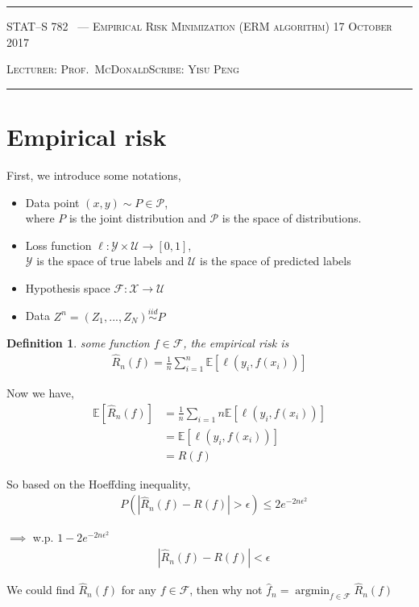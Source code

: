 \documentclass[10pt]{article}
\newcounter{lecnum}
\newtheorem{definition}[def]{Definition}
\newcommand{\Expect}[1]{\mathbb{E}\!\left[#1\right]}
\newcommand{\Y}{\mathcal{Y}}
\newcommand{\U}{\mathcal{U}}
\DeclareMathOperator*{\argmin}{argmin}
\renewcommand{\hat}{\widehat}
\newcommand{\lecturer}{Prof.\ McDonald}
\newcommand{\scribe}{Yisu Peng}
\newcommand{\chtitle}{Empirical Risk Minimization (ERM algorithm)}
\newcommand{\lecdate}{17 October 2017}
\begin{document}
\rule{6.5in}{1pt}

\textsc{STAT--S 782
        \hfill \thelecnum\ --- \chtitle
        \hfill \lecdate}

\textsc{Lecturer: \lecturer \hfill Scribe: \scribe}
\rule{6.5in}{1pt}

\section{Empirical risk}
First, we introduce some notations,
\begin{itemize}
\item Data point $(x, y) \sim P \in \mathcal{P}$, \\
where $P$ is the joint distribution and $\mathcal{P}$ is the space of distributions.
\item Loss function $\ell : \mathcal Y \times \mathcal U \rightarrow [0, 1]$,\\
$\Y$ is the space of true labels and $\U$ is the space of predicted labels
\item Hypothesis space $\mathcal{F} : \mathcal{X} \rightarrow \mathcal{U}$
\item Data $Z^n = (Z_1, ... , Z_N) \overset{iid}\sim P$
\end{itemize}

\begin{definition}
some function $f \in \mathcal{F}$, the empirical risk is
\begin{align}
\hat{R}_n(f) = \frac{1}{n} \sum_{i=1}^{n} \Expect{\ell(y_i, f(x_i))}
\end{align}
\end{definition}

Now we have,
\begin{align*}
\Expect{\hat{R}_n(f)} &= \frac{1}{n} \sum_{i=1}{n} \Expect{\ell (y_i, f(x_i))}\\
	&= \Expect{\ell(y_i, f(x_i))}\\
	&= R(f)
\end{align*}

So based on the Hoeffding inequality,
\begin{align*}
&P(|\hat{R}_n(f) - R(f)| > \epsilon) \le 2 e^{-2n\epsilon^2}
\end{align*}

$\implies$ w.p. $1-2e^{-2n\epsilon^2}$
\begin{align*}
&|\hat{R}_n(f) - R(f)| < \epsilon
\end{align*}

We could find $\hat R_n (f)$ for any $f \in \mathcal{F}$, then why not $\hat f_n = \argmin_{f\in \mathcal F} \hat R_n (f)$
\end{document}
